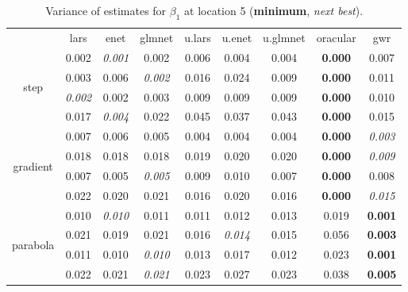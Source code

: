 \documentclass[authoryear, review, 11pt]{elsarticle}
\begin{document}
\begin{table}[ht]
\begin{center}
\begin{tabular}{ccccccccc}
  & lars & enet & glmnet & u.lars & u.enet & u.glmnet & oracular & gwr \\ 
  \cline{2-9}
  \multirow{4}{*}{step} & 0.002 & \emph{0.001} & 0.002 & 0.006 & 0.004 & 0.004 & \textbf{0.000} & 0.007 \\ 
  & 0.003 & 0.006 & \emph{0.002} & 0.016 & 0.024 & 0.009 & \textbf{0.000} & 0.011 \\ 
  & \emph{0.002} & 0.002 & 0.003 & 0.009 & 0.009 & 0.009 & \textbf{0.000} & 0.010 \\ 
  & 0.017 & \emph{0.004} & 0.022 & 0.045 & 0.037 & 0.043 & \textbf{0.000} & 0.015 \\ 
  \cline{2-9}
  \multirow{4}{*}{gradient} & 0.007 & 0.006 & 0.005 & 0.004 & 0.004 & 0.004 & \textbf{0.000} & \emph{0.003} \\ 
  & 0.018 & 0.018 & 0.018 & 0.019 & 0.020 & 0.020 & \textbf{0.000} & \emph{0.009} \\ 
  & 0.007 & 0.005 & \emph{0.005} & 0.009 & 0.010 & 0.007 & \textbf{0.000} & 0.008 \\ 
  & 0.022 & 0.020 & 0.021 & 0.016 & 0.020 & 0.016 & \textbf{0.000} & \emph{0.015} \\ 
  \cline{2-9}
  \multirow{4}{*}{parabola} & 0.010 & \emph{0.010} & 0.011 & 0.011 & 0.012 & 0.013 & 0.019 & \textbf{0.001} \\ 
  & 0.021 & 0.019 & 0.021 & 0.016 & \emph{0.014} & 0.015 & 0.056 & \textbf{0.003} \\ 
  & 0.011 & 0.010 & \emph{0.010} & 0.013 & 0.017 & 0.012 & 0.023 & \textbf{0.001} \\ 
  & 0.022 & 0.021 & \emph{0.021} & 0.023 & 0.027 & 0.023 & 0.038 & \textbf{0.005} \\ 
  \end{tabular}
\caption{Variance of estimates for $\beta_1$ at location 5 (\textbf{minimum}, \emph{next best}).\label{table:loc5-X1-varx}}
\end{center}
\end{table}
\end{document}
